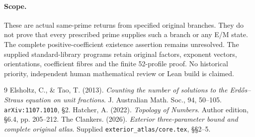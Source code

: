 \documentclass[11pt,reqno]{amsart}
\begin{document}
\paragraph{Scope.}
These are actual same-prime returns from specified original branches.
They do not prove that every prescribed prime supplies such a branch or any E/M
state. The complete positive-coefficient existence assertion remains unresolved.
The supplied standard-library programs retain original factors, exponent vectors,
orientations, coefficient fibres and the finite 52-profile proof. No historical
priority, independent human mathematical review or Lean build is claimed.

\begin{thebibliography}{9}
 Elsholtz, C., \& Tao, T. (2013). \emph{Counting the number of solutions
to the Erd\H{o}s--Straus equation on unit fractions}. J. Australian Math. Soc.,
94, 50--105. \texttt{arXiv:1107.1010}, \S2.
 Hatcher, A. (2022). \emph{Topology of Numbers}. Author edition,
\S6.4, pp. 205--212.
 The Clankers. (2026). \emph{Exterior three-parameter bound and
complete original atlas}. Supplied \texttt{exterior\_atlas/core.tex}, \S\S2--5.
\end{thebibliography}
\end{document}
